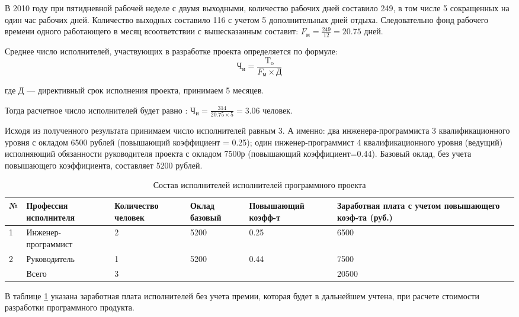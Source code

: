 В 2010 году при пятидневной рабочей неделе с двумя выходными, количество рабочих дней составило 249,
в том числе 5 сокращенных на один час рабочих дней. Количество выходных составило 116 с учетом 5
дополнительных дней отдыха. Следовательно фонд рабочего времени одного работающего в месяц всоответствии
с вышесказанным составит: $F_{\textrm{м}} = \frac{249}{12} = 20.75$ дней.


Среднее число исполнителей, участвующих в разработке проекта определяется по формуле:
\begin{equation}
	\textrm{Ч}_{\textrm{и}} = \frac{\textrm{T}_{\textrm{o}}} {F_{\textrm{м}} \times{} \textrm{Д}}
\end{equation}
\begin{ESKDexplanation}
	\item[где ] Д --- директивный срок исполнения проекта, принимаем 5 месяцев.
\end{ESKDexplanation}
Тогда расчетное число исполнителей будет равно : $\textrm{Ч}_{\textrm{и}} = \frac{314}{20.75 \times{} 5} = 3.06$ человек.

\begin{par}
Исходя из полученного результата принимаем число исполнителей равным 3.
А именно: два инженера-программиста 3 квалификационного уровня с окладом 6500 рублей (повышающий коэффициент = 0.25);
один инженер-программист 4 квалификационного уровня (ведущий) исполняющий обязанности руководителя
проекта с окладом 7500р (повышающий коэффициент=0.44). Базовый оклад, без учета повышающего коэффициента,
составляет 5200 рублей.
\end{par}

\begin{table}
\caption{Состав исполнителей исполнителей программного проекта}
\begin{tabular}{|l|p{3cm}|p{2.5cm}|p{2.5cm}|p{3cm}|p{2.5cm}|}
\hline{}
№ & Профессия исполнителя & Количество человек & Оклад базовый & Повышающий  коэфф-т & Заработная плата с учетом повышающего коэф-та (руб.) \\
\hline{}
1 & Инженер-программист & 2 & 5200 & 0.25 & 6500 \\
\hline{}
2 & Руководитель & 1 & 5200 & 0.44 & 7500 \\
\hline{}
& Всего & 3  & & & 20500 \\
\hline
\end{tabular}
\label{table:employeeList}
\end{table}


\begin{par}
В таблице \ref{table:employeeList} указана заработная плата исполнителей без учета премии, которая будет в
дальнейшем учтена, при расчете стоимости разработки программного продукта.
\end{par}

